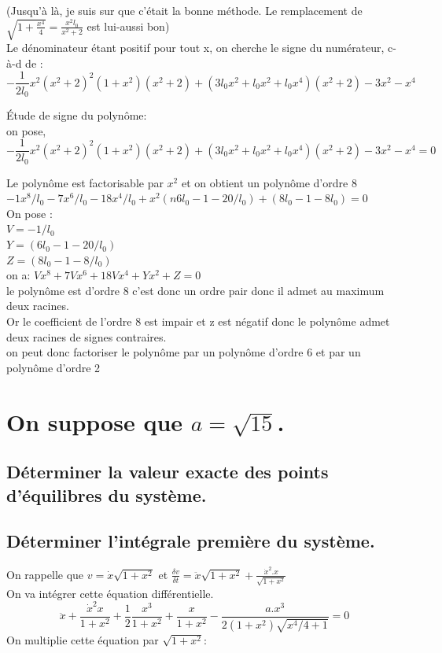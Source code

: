 \documentclass[10pt,a4paper]{article}
\begin{document}
(Jusqu'à là, je suis sur que c'était la bonne méthode. Le remplacement de $\sqrt{1+\frac{x^4}{4}}=\frac{x^2l_0}{x^2+2}$ est lui-aussi bon) \\

Le dénominateur étant positif pour tout x, on cherche le signe du numérateur, c-à-d de :\\
\[ -\frac{1}{2l_0}x^2(x^2+2)^2(1+x^2)(x^2+2)+(3l_0x^2+l_0x^2+l_0x^4)(x^2+2)-3x^2-x^4 \]

Étude de signe du polynôme:\\
on pose, \[ -\frac{1}{2l_0}x^2(x^2+2)^2(1+x^2)(x^2+2)+(3l_0x^2+l_0x^2+l_0x^4)(x^2+2)-3x^2-x^4  = 0\]

Le polynôme est factorisable par $x^2$ et on obtient un polynôme d'ordre 8\\
$-1x^8/l_0-7x^6/l_0-18x^4/l_0+x^2(n 6l_0-1-20/l_0)+(8l_0-1-8l_0) = 0$\\
On pose :\\ $V = -1/l_0$\\   $Y = (6l_0-1-20/l_0)$\\   $Z = (8l_0-1-8/l_0)$\\
on a: $Vx^8+7Vx^6+18Vx^4+Yx^2+Z = 0$\\
le polynôme est d'ordre 8 c'est donc un ordre pair donc il admet au maximum deux racines.\\
Or le coefficient de l'ordre 8 est impair et z est négatif donc le polynôme admet deux racines de signes contraires.\\
on peut donc factoriser le polynôme par un polynôme d'ordre 6 et par un polynôme d'ordre 2\\










\section{On suppose que $a=\sqrt{15}$.}
\subsection{Déterminer la valeur exacte des points d'équilibres du système.}
\subsection{Déterminer l'intégrale première du système.}
	On rappelle que $v=\dot{x}\sqrt{1 + x^2}$ et $\frac{\delta{v}}{\delta{t}}=\ddot{x}\sqrt{1 + x^2} + \frac{\dot{x}^2.x}{\sqrt{1+x^2}}$ \\
On va intégrer cette équation différentielle.
\[  \ddot{x}+\frac{\dot{x}^2x}{1+x^2} + \frac{1}{2}\frac{x^3}{1+x^2} + \frac{x}{1+x^2} - \frac{a.x^3}{2(1+x^2)\sqrt{x^4/4+1}}=0 \]	
On multiplie cette équation par $\sqrt{1+x^2}$:
\end{document}
